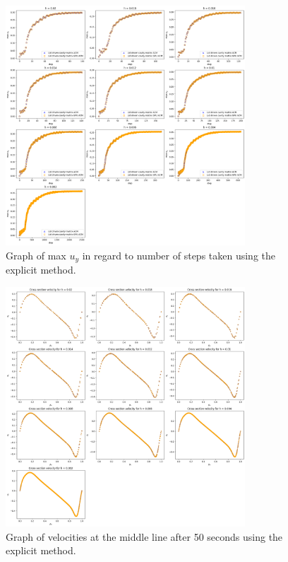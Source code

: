 \documentclass{article}
\begin{document}
\begin{figure}[h!] 
    \centering 
    \includegraphics[width=0.8\textwidth]{plots/lidDrivenACM_convergence.png} 
    \caption{Graph of max $u_y$ in regard to number of steps taken using the explicit method.} 
    \label{fig:lidDrivenACM_convergence} 
\end{figure}
\begin{figure}[h!] 
    \centering 
    \includegraphics[width=0.8\textwidth]{plots/lidDrivenACM_cross.png} 
    \caption{Graph of velocities at the middle line after 50 seconds using the explicit method.} 
    \label{fig:lidDrivenACM_cross} 
\end{figure}
\end{document}
